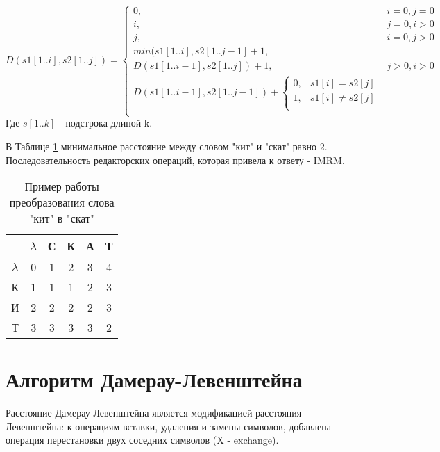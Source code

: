     \begin{equation}\label{formula:Levenshtein}
        D(s1[1..i],s2[1..j]) = \left\{ \begin{array}{ll}
            0, & \textrm{$i = 0, j = 0$}\\
            i, & \textrm{$j = 0, i > 0$}\\
            j, & \textrm{$i = 0, j > 0$}\\
           min(s1[1..i],s2[1..j-1]+ 1,\\
           D(s1[1..i-1],s2[1..j]) + 1, &\textrm{$j>0, i>0$}\\
           D(s1[1..i-1],s2[1..j-1]) +  
            \left\{ \begin{array}{ll}
                0, & \textrm{$s1[i] = s2[j]$}\\
                1, & \textrm{$s1[i] \ne s2[j]$}\\
            \end{array} \right.\\
        \end{array} \right.
    \end{equation}
    Где $s[1..k]$ - подстрока длиной k.

    В Таблице \ref{table:example:Levenshtein} минимальное расстояние между
    словом "кит" и "скат" равно 2. Последовательность редакторских операций, 
    которая привела к ответу - IMRM.

    \begin{table}[h]
        \caption{Пример работы преобразования слова "кит" в "скат"}
        \begin{tabular}{|c|c|c|c|c|c|}
        \hline
  & $\lambda$ & С & К & А & Т \\ \hline
$\lambda$ & 0 & 1 & 2 & 3 & 4 \\ \hline
        К & 1 & 1 & 1 & 2 & 3 \\ \hline
        И & 2 & 2 & 2 & 2 & 3 \\ \hline
        Т & 3 & 3 & 3 & 3 & \cellcolor[HTML]{FFCCC9}2 \\ \hline
        \end{tabular}
        \label{table:example:Levenshtein}
    \end{table}

    \section{Алгоритм Дамерау-Левенштейна}
    Расстояние Дамерау-Левенштейна является модификацией расстояния Левенштейна:
    к операциям вставки, удаления и замены символов, добавлена операция перестановки
    двух соседних символов (X - exchange).
    
\newpage